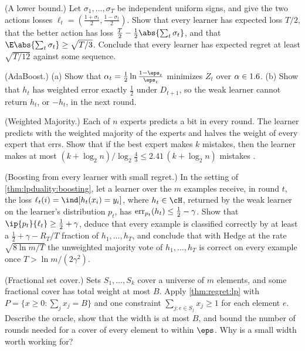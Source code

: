 \begin{refsection}
\begin{exercises}
\item \consolidation\hard (A lower bound.) Let $\sigma_1,\dots,\sigma_T$ be independent uniform signs, and give the two actions losses $\ell_t=(\frac{1+\sigma_t}2,\frac{1-\sigma_t}2)$. Show that every learner has expected loss $T/2$, that the better action has loss $\frac T2-\frac12\abs{\sum_t\sigma_t}$, and that $\E\abs{\sum_t\sigma_t}\ge\sqrt{T/3}$. Conclude that every learner has expected regret at least $\sqrt{T/12}$ against some sequence. \label{ex:regret:lower}

\item \consolidation (AdaBoost.) (a) Show that $\alpha_t=\frac12\ln\frac{1-\eps_t}{\eps_t}$ minimizes $Z_t$ over $\alpha\in1.6$. (b) Show that $h_t$ has weighted error exactly $\frac12$ under $D_{t+1}$, so the weak learner cannot return $h_t$, or $-h_t$, in the next round.\label{ex:regret:adaboost}

\item \consolidation (Weighted Majority.) Each of $n$ experts predicts a bit in every round. The learner predicts with the weighted majority of the experts and halves the weight of every expert that errs. Show that if the best expert makes $k$ mistakes, then the learner makes at most $(k+\log_2n)/\log_2\frac43\le2.41\,(k+\log_2n)$ mistakes \parencite{LittlestoneWarmuth1994}.\label{ex:regret:wm}

\item \transfer (Boosting from every learner with small regret.) In the setting of \cref{thm:lpduality:boosting}, let a learner over the $m$ examples receive, in round $t$, the loss $\ell_t(i)=\ind[h_t(x_i)=y_i]$, where $h_t\in\cH$, returned by the weak learner on the learner's distribution $p_t$, has $\operatorname{err}_{p_t}(h_t)\le\frac12-\gamma$. Show that $\ip{p_t}{\ell_t}\ge\frac12+\gamma$, deduce that every example is classified correctly by at least a $\frac12+\gamma-R_T/T$ fraction of $h_1,\dots,h_T$, and conclude that with Hedge at the rate $\sqrt{8\ln m/T}$ the unweighted majority vote of $h_1,\dots,h_T$ is correct on every example once $T>\ln m/(2\gamma^2)$.\label{ex:regret:boostanylearner}

\item \transfer (Fractional set cover.) Sets $S_1,\dots,S_k$ cover a universe of $m$ elements, and some fractional cover has total weight at most $B$. Apply \cref{thm:regret:lp} with $P=\{x\ge0:\sum_jx_j=B\}$ and one constraint $\sum_{j:e\in S_j}x_j\ge1$ for each element $e$. Describe the oracle, show that the width is at most $B$, and bound the number of rounds needed for a cover of every element to within $\eps$. Why is a small width worth working for?\label{ex:regret:setcover}


\end{exercises}
\end{refsection}
